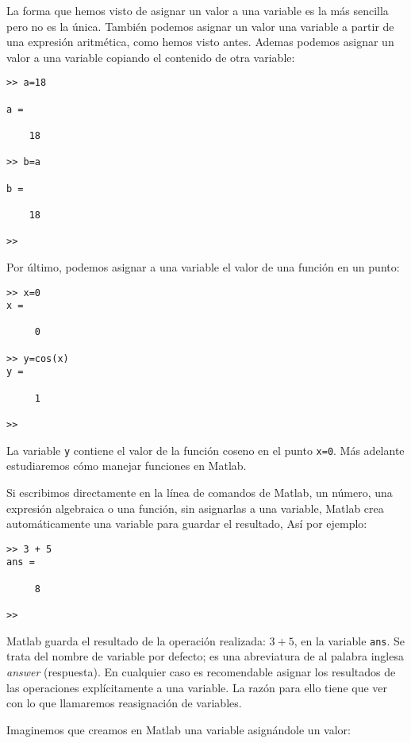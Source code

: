  La forma que hemos visto de asignar un valor a una variable es la más sencilla pero no es la única. También podemos asignar un valor una variable a partir de una expresión aritmética, como hemos visto antes. Ademas podemos asignar un valor a una variable copiando el contenido de otra variable:
\begin{verbatim}
>> a=18

a =

    18

>> b=a

b =

    18

>> 
\end{verbatim}
Por último, podemos asignar a una variable el valor de una función en un punto:
\begin{verbatim}
>> x=0
x =

     0

>> y=cos(x)
y =

     1

>> 
\end{verbatim}

La variable \texttt{y} contiene el valor de la función coseno en el punto \texttt{x=0}. Más adelante estudiaremos cómo manejar funciones en Matlab. 

Si escribimos directamente en la línea de comandos de Matlab, un número, una expresión algebraica o una función, sin asignarlas a una variable, Matlab crea automáticamente una variable para guardar el resultado, Así por ejemplo:
\begin{verbatim}
>> 3 + 5
ans =

     8

>> 
\end{verbatim}
Matlab guarda el resultado de la operación realizada: $3+5$, en la variable \texttt{ans}.  Se trata del nombre de variable por defecto; es una abreviatura de al palabra inglesa \emph{answer} (respuesta).  En cualquier caso es recomendable asignar los resultados de las operaciones explícitamente a una variable.  La razón para ello tiene que ver con lo que llamaremos reasignación de variables.

Imaginemos que creamos en Matlab una variable asignándole un valor:


